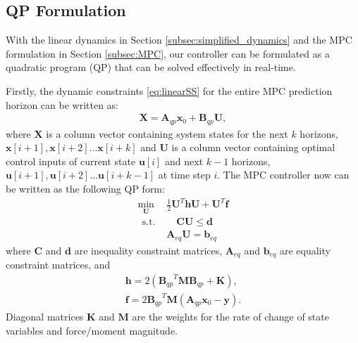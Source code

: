 \subsection{QP Formulation}
With the linear dynamics in Section \ref{subsec:simplified_dynamics} and the MPC formulation in Section \ref{subsec:MPC}, our controller can be formulated as a quadratic program (QP) that can be solved effectively in real-time. 

Firstly, the dynamic constraints \eqref{eq:linearSS} for the entire MPC prediction horizon can be written as:
\begin{align}
\label{eq:QPdynamics}
\bm X = \bm{A}_{qp} \bm x_0 + \bm{B}_{qp} \bm U,
\end{align}
where $\bm X$ is a column vector containing system states for the next $k$ horizons, $\bm x[i+1],\bm x[i+2] \dots {\bm x}[i+k]$ and $\bm U$ is a column vector containing optimal control inputs of current state $\bm u[i]$ and next $k-1$ horizons, $\bm u[i+1], \bm u[i+2] \dots {\bm u}[i+k-1]$ at time step $i$. 
The MPC controller now can be written as the following QP form:     
\begin{align}
\label{eq:QPform}
\underset{\bm{U}}{\operatorname{min}}   \:\:  & \frac{1}{2}\bm U^T\bm h \bm U + \bm U^T\bm f \\
\label{eq:QPineqCons}
\:\:\mbox{s.t. }& \quad  \bm C\bm U \leq \bm d \\
\label{eq:QPeqCons}
& \bm A_{eq}\bm U = \bm b_{eq}
\end{align}
where $\bm C$ and $\bm d$ are inequality constraint matrices, $\bm A_{eq}$ and $\bm b_{eq}$ are equality constraint matrices, and 
\begin{align}
\label{eq:h}
\bm h = 2( {\bm B_{qp}}^T\mathbf M {\bm B_{qp}}+\mathbf K), \\
\label{eq:f}
\bm f = 2 {\bm B_{qp}}^T\mathbf M ({\bm A_{qp}}\bm x_0-\bm y).
\end{align}
Diagonal matrices $\mathbf K$ and $\mathbf M$ are the weights for the rate of change of state variables and force/moment magnitude.

